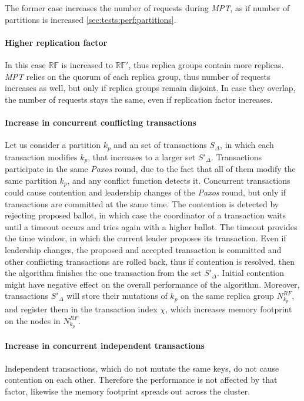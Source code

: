 \documentclass[runningheads,a4paper]{llncs}
\newcommand{\transaction}{$\Delta$\xspace}
\newcommand{\txIndex}{$\chi$\xspace}
\newcommand{\paxos}{\emph{Paxos}\xspace}
\newcommand{\mpt}{\emph{MPT}\xspace}
\newcommand{\RFalone}{$\mathbb{RF}$\xspace}
\newcommand{\RFalonePrim}{$\mathbb{RF'}$\xspace}
\begin{document}
The former case increases the number of requests during \mpt, as if number of partitions is increased \ref{sec:tests:perf:partitions}.

\paragraph{Higher replication factor}
In this case \RFalone is increased to \RFalonePrim, thus replica groups contain more replicas. \mpt relies on the quorum of each replica group, thus number of requests increases as well, but only if replica groups remain disjoint. In case they overlap, the number of requests stays the same, even if replication factor increases.

\paragraph{Increase in concurrent conflicting transactions}
Let us consider a partition $k_p$ and an set of transactions $S_{\text{\transaction}}$, in which each transaction modifies $k_p$, that increases to a larger set $S'_{\text{\transaction}}$. 
Transactions participate in the same \paxos round, due to the fact that all of them modify the same partition $k_p$, and any conflict function \label{sec:theory:conflictFunctions} detects it.
Concurrent transactions could cause contention and leadership changes of the \paxos round, but only if transactions are committed at the same time. The contention is detected by rejecting proposed ballot, in which case the coordinator of a transaction waits until a timeout occurs and tries again with a higher ballot. The timeout provides the time window, in which the current leader proposes its transaction. Even if leadership changes, the proposed and accepted transaction is committed and other conflicting transactions are rolled back, thus if contention is resolved, then the algorithm finishes the one transaction from the set $S'_{\text{\transaction}}$. Initial contention might have negative effect on the overall performance of the algorithm. Moreover, transactions $S'_{\text{\transaction}}$ will store their mutations of $k_p$ on the same replica group $N^{RF}_{k_p}$, and register them in the transaction index \txIndex, which increases memory footprint on the nodes in $N^{RF}_{k_p}$.

\paragraph{Increase in concurrent independent transactions}
Independent transactions, which do not mutate the same keys, do not cause contention on each other. Therefore the performance is not affected by that factor, likewise the memory footprint spreads out across the cluster.
\end{document}

